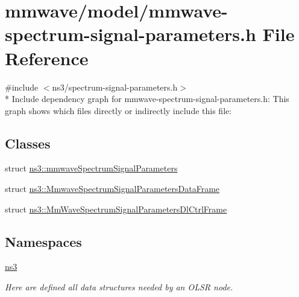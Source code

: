 \hypertarget{mmwave-spectrum-signal-parameters_8h}{}\section{mmwave/model/mmwave-\/spectrum-\/signal-\/parameters.h File Reference}
\label{mmwave-spectrum-signal-parameters_8h}
{\ttfamily \#include $<$ns3/spectrum-\/signal-\/parameters.\+h$>$}\\*
Include dependency graph for mmwave-\/spectrum-\/signal-\/parameters.h\+:
This graph shows which files directly or indirectly include this file\+:
\subsection*{Classes}
\begin{DoxyCompactItemize}
\item 
struct \hyperlink{structns3_1_1mmwaveSpectrumSignalParameters}{ns3\+::mmwave\+Spectrum\+Signal\+Parameters}
\item 
struct \hyperlink{structns3_1_1MmwaveSpectrumSignalParametersDataFrame}{ns3\+::\+Mmwave\+Spectrum\+Signal\+Parameters\+Data\+Frame}
\item 
struct \hyperlink{structns3_1_1MmWaveSpectrumSignalParametersDlCtrlFrame}{ns3\+::\+Mm\+Wave\+Spectrum\+Signal\+Parameters\+Dl\+Ctrl\+Frame}
\end{DoxyCompactItemize}
\subsection*{Namespaces}
\begin{DoxyCompactItemize}
\item 
 \hyperlink{namespacens3}{ns3}
\begin{DoxyCompactList}\small\item\em Here are defined all data structures needed by an O\+L\+SR node. \end{DoxyCompactList}\end{DoxyCompactItemize}
